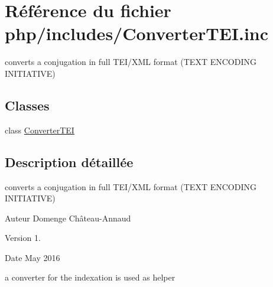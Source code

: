 \hypertarget{ConverterTEI_8inc}{}\section{Référence du fichier php/includes/\+Converter\+T\+EI.inc}
\label{ConverterTEI_8inc}


converts a conjugation in full T\+E\+I/\+X\+ML format (T\+E\+XT E\+N\+C\+O\+D\+I\+NG I\+N\+I\+T\+I\+A\+T\+I\+VE)  


\subsection*{Classes}
\begin{DoxyCompactItemize}
\item 
class \hyperlink{classConverterTEI}{Converter\+T\+EI}
\end{DoxyCompactItemize}


\subsection{Description détaillée}
converts a conjugation in full T\+E\+I/\+X\+ML format (T\+E\+XT E\+N\+C\+O\+D\+I\+NG I\+N\+I\+T\+I\+A\+T\+I\+VE) 

\begin{DoxyAuthor}{Auteur}
Domenge Château-\/\+Annaud 
\end{DoxyAuthor}
\begin{DoxyVersion}{Version}
1. 
\end{DoxyVersion}
\begin{DoxyDate}{Date}
May 2016
\end{DoxyDate}
a converter for the indexation is used as helper 